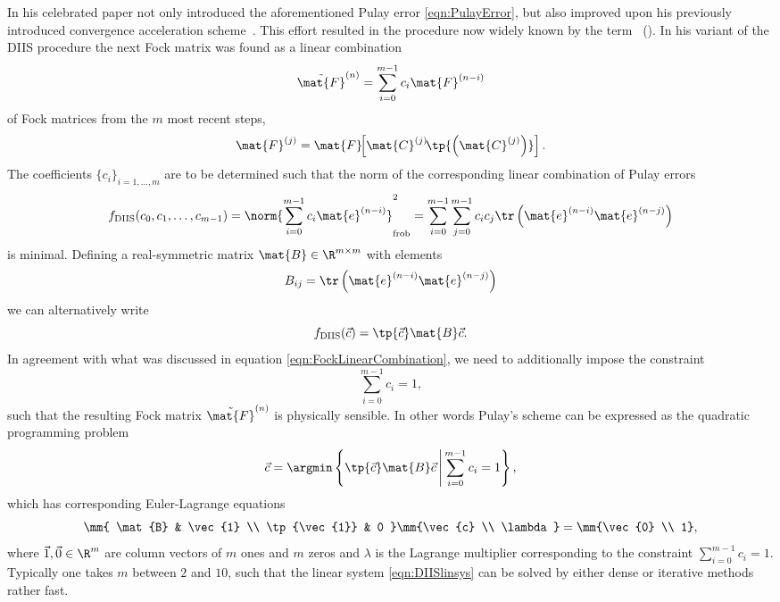 In his celebrated \citeyear{Pulay1982} paper \citeauthor{Pulay1982}
not only introduced the aforementioned Pulay error \eqref{eqn:PulayError},
but also improved upon his previously introduced
\SCF convergence acceleration scheme~\cite{Pulay1980}.
This effort resulted in the procedure now widely known
by the term ~(\DIIS).
In his variant of the DIIS procedure the next Fock matrix was found
as a linear combination
\begin{equation}
	\tilde{\mat{F}}^{(n)} = \sum_{i=0}^{m-1} c_i \mat{F}^{(n-i)}
	\label{eqn:DIISfock}
\end{equation}
of Fock matrices from the $m$ most recent \SCF steps, \ie
\[ \mat{F}^{(j)}
	= \mat{F}\!\!\left[\mat{C}^{(j)}\!\tp{\left(\mat{C}^{(j)}\right)}\right].
\]
The coefficients $\{c_i\}_{i=1,\ldots,m}$ are to be determined such that
the norm of the corresponding linear combination of Pulay errors
\begin{equation}
	f_\text{DIIS}(c_0, c_1, \ldots, c_{m-1})
	= \norm{\sum_{i=0}^{m-1} c_i \mat{e}^{(n-i)}}_\text{frob}^2 
	= \sum_{i=0}^{m-1} \sum_{j=0}^{m-1} c_i c_j \tr\left( \mat{e}^{(n-i)} \mat{e}^{(n-j)}  \right)
\end{equation}
is minimal.
Defining a real-symmetric matrix $\mat{B} \in \R^{m\times m}$ with elements
\begin{equation}
	B_{ij} = \tr\left( \mat{e}^{(n-i)} \mat{e}^{(n-j)} \right)
	\label{eqn:BMatElem}
\end{equation}
we can alternatively write
\begin{equation}
	f_\text{DIIS}(\vec{c}) = \tp{\vec{c}} \mat{B} \vec{c}.
	\label{eqn:DIISobjective}
\end{equation}
In agreement with what was discussed in equation \eqref{eqn:FockLinearCombination},
we need to additionally impose the constraint
\[
	\sum_{i=0}^{m-1} c_i = 1,
\]
such that the resulting Fock matrix $\tilde{\mat{F}}^{(n)}$ is physically sensible.
In other words Pulay's \DIIS scheme can be expressed
as the quadratic programming problem
\[
	\vec{c} = \argmin\left\{
		\tp{\vec{c}} \mat{B} \vec{c}
		\, \middle| \,
		\sum_{i=0}^{m-1} c_i = 1
	\right\},
\]
which has corresponding Euler-Lagrange equations
\begin{equation}
	\mm{
		\mat{B} & \vec{1} \\
		\tp{\vec{1}} & 0
	}
	\mm{\vec{c} \\ \lambda}
	= \mm{\vec{0} \\ 1},
	\label{eqn:DIISlinsys}
\end{equation}
where $\vec{1}, \vec{0} \in \R^m$ are column vectors of $m$ ones and $m$ zeros
and $\lambda$ is the Lagrange multiplier corresponding to the constraint
$\sum_{i=0}^{m-1} c_i = 1$.
Typically one takes $m$ between $2$ and $10$,
such that the linear system \eqref{eqn:DIISlinsys} can be solved by either dense
or iterative methods rather fast.

